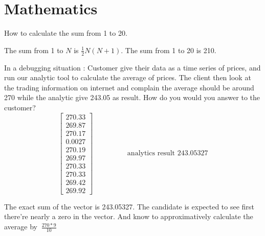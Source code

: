 \documentclass[answers]{exam}
\begin{document}
\section{Mathematics}
\renewcommand{\questionlabel}{Math.~\thequestion ]}
\begin{questions}
\question How to calculate the sum from 1 to 20.
\begin{solution}[.2in]
	The sum from 1 to $N$ is $\frac{1}{2}N(N+1)$. The sum from 1 to 20 is 210.
\end{solution}

\question In a debugging situation : Customer give their data as a time series of prices, and run our analytic tool to calculate the average of prices. The client then look at the trading information on internet and complain the average should be around 270 while the analytic give 243.05 as result. How do you would you answer to the customer? 
\[
\left[ 
\begin{array}{c}
270.33 \\
269.87 \\
270.17 \\
0.0027 \\
270.19 \\
269.97 \\
270.33 \\
270.33 \\
269.42 \\
269.92
\end{array}
\right]
\hspace{2cm}
\text{analytics result 243.05327}
\]
\begin{solution}[.2in]
	The exact sum of the vector is 243.05327. The candidate is expected to see first there're nearly a zero in the vector. And know to approximatively calculate the average by $~ \frac{270*9}{10}$
\end{solution}


\end{questions}
\end{document}
